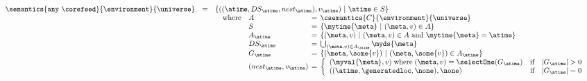\begin{figure*}[t]
\[\begin{array}{lcl}
\semantics{\mathtt{any}\ \corefeed}{\environment}{\universe}
& = & \{ ((\atime, DS_\atime, {nest}_\atime), v_\atime)\ |\ \atime \in S\}\\
&&
\begin{array}{l}
 \begin{array}{ll@{\hspace{1ex}}c@{\hspace{1ex}}l}
 \mbox{where} & A        & = &\csemantics{C}{\environment}{\universe}\\
              & S        & = & \{\mytime{\meta}\ |\ (\meta, v) \in A\}\\
              & A_\atime & = & \{(\meta,v)\ | \ (\meta, v) \in A\ \mbox{and} \ \mytime{\meta} = \atime\}\\
              & DS_\atime & = & \bigcup_{(\meta,v) \in A_\atime} \myds{\meta} \\
              & G_\atime & = & \{(\meta,\some{v})\ | \ (\meta, \some{v}) \in A_\atime\}\\
              & ({nest}_\atime,v_\atime) & = & \left\{ \begin{array}{lll}
                                           (\myval{\meta},v)\; \mbox{where} \; (\meta,v) = \mbox{\selectOne}(G_\atime)  & \mbox{if} & |G_\atime| > 0\\
                                           ((\atime,\generatedloc,\none), \none) & \mbox{if} & |G_\atime| = 0 \\
                                           \end{array} \right.
 \end{array}
\end{array} 
\\\\


\end{array}\]
\end{figure*}
